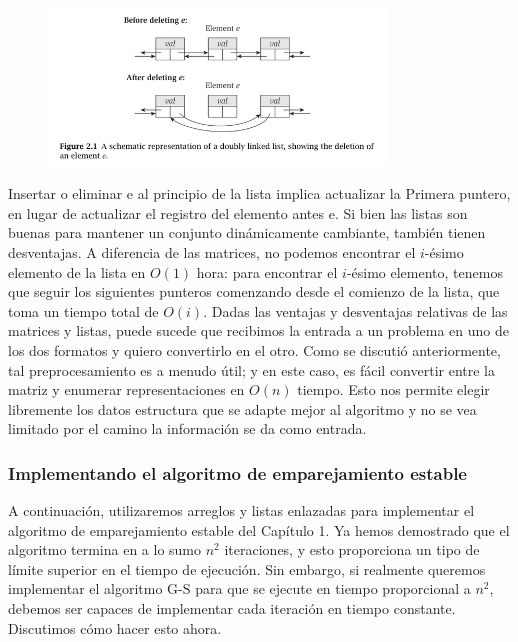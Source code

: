 \documentclass[a4paper, 12pt]{book}
\begin{document}
\begin{figure}[h] 
  \centering
    \includegraphics[width=0.8\textwidth]{Imagenes-Seccion2/fig2_1.PNG}
\end{figure}


Insertar o eliminar e al principio de la lista implica actualizar la Primera
puntero, en lugar de actualizar el registro del elemento antes e.
Si bien las listas son buenas para mantener un conjunto dinámicamente cambiante, también tienen desventajas. A diferencia de las matrices, no podemos encontrar el $i$-ésimo elemento de la lista en $O(1)$ hora: para encontrar el $i$-ésimo elemento, tenemos que seguir los siguientes punteros comenzando
desde el comienzo de la lista, que toma un tiempo total de $O(i)$.
Dadas las ventajas y desventajas relativas de las matrices y listas, puede
sucede que recibimos la entrada a un problema en uno de los dos formatos y
quiero convertirlo en el otro. Como se discutió anteriormente, tal preprocesamiento es
a menudo útil; y en este caso, es fácil convertir entre la matriz y
enumerar representaciones en $O(n)$ tiempo. Esto nos permite elegir libremente los datos
estructura que se adapte mejor al algoritmo y no se vea limitado por el camino
la información se da como entrada.\\


\subsubsection*{Implementando el algoritmo de emparejamiento estable}

A continuación, utilizaremos arreglos y listas enlazadas para implementar el algoritmo de emparejamiento estable del Capítulo 1. Ya hemos demostrado que el algoritmo termina en a lo sumo $n^2$ iteraciones, y esto proporciona un tipo de límite superior en el tiempo de ejecución. Sin embargo, si realmente queremos implementar el algoritmo G-S para que se ejecute en tiempo proporcional a $n^2$, debemos ser capaces de implementar cada iteración en tiempo constante. Discutimos cómo hacer esto ahora.\\
\end{document}
